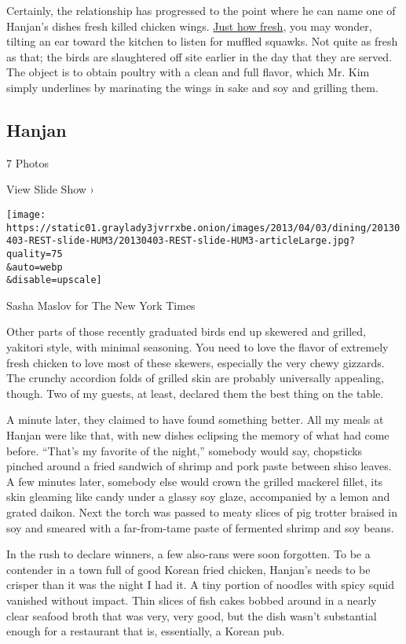 Certainly, the relationship has progressed to the point where he can
name one of Hanjan's dishes fresh killed chicken wings.
\href{http://dinersjournal.blogs.nytimes3xbfgragh.onion/2013/03/20/at-hanjan-its-no-secret-when-the-chicken-died/}{Just
how fresh}, you may wonder, tilting an ear toward the kitchen to listen
for muffled squawks. Not quite as fresh as that; the birds are
slaughtered off site earlier in the day that they are served. The object
is to obtain poultry with a clean and full flavor, which Mr. Kim simply
underlines by marinating the wings in sake and soy and grilling them.

\href{https://www.nytimes3xbfgragh.onion/slideshow/2013/04/03/dining/20130403-REST.html}{}

\hypertarget{hanjan}{%
\subsection{Hanjan}\label{hanjan}}

7 Photos

View Slide Show ›

\texttt{[image: https://static01.graylady3jvrrxbe.onion/images/2013/04/03/dining/20130403-REST-slide-HUM3/20130403-REST-slide-HUM3-articleLarge.jpg?quality=75\\\&auto=webp\\\&disable=upscale]}

Sasha Maslov for The New York Times

Other parts of those recently graduated birds end up skewered and
grilled, yakitori style, with minimal seasoning. You need to love the
flavor of extremely fresh chicken to love most of these skewers,
especially the very chewy gizzards. The crunchy accordion folds of
grilled skin are probably universally appealing, though. Two of my
guests, at least, declared them the best thing on the table.

A minute later, they claimed to have found something better. All my
meals at Hanjan were like that, with new dishes eclipsing the memory of
what had come before. ``That's my favorite of the night,'' somebody
would say, chopsticks pinched around a fried sandwich of shrimp and pork
paste between shiso leaves. A few minutes later, somebody else would
crown the grilled mackerel fillet, its skin gleaming like candy under a
glassy soy glaze, accompanied by a lemon and grated daikon. Next the
torch was passed to meaty slices of pig trotter braised in soy and
smeared with a far-from-tame paste of fermented shrimp and soy beans.

In the rush to declare winners, a few also-rans were soon forgotten. To
be a contender in a town full of good Korean fried chicken, Hanjan's
needs to be crisper than it was the night I had it. A tiny portion of
noodles with spicy squid vanished without impact. Thin slices of fish
cakes bobbed around in a nearly clear seafood broth that was very, very
good, but the dish wasn't substantial enough for a restaurant that is,
essentially, a Korean pub.

